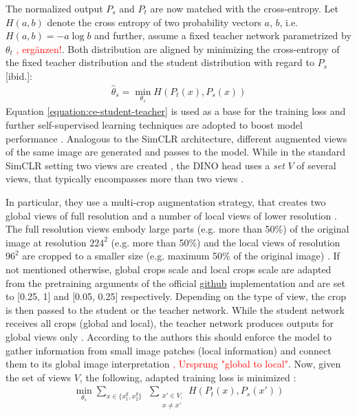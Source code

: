 \par
The normalized output $P_s$ and $P_t$ are now matched with the cross-entropy.
Let $H(a,b)$ denote the cross entropy of two probability vectors $a$, $b$, i.e. $H(a,b)=-a \log b$ and further, assume a fixed teacher network parametrized by $\theta_t$ \textcolor{red}{\citep{Caron2021}, ergänzen!}.
Both distribution are aligned by minimizing the cross-entropy of the fixed teacher distribution and the student distribution with regard to $P_s$ [ibid.]: 
\begin{align}
	\hat{\theta}_s = \min_{\theta_s}H(P_t(x),P_s(x))
	\label{equation:ce-student-teacher}	
\end{align}
Equation \ref{equation:ce-student-teacher} is used as a base for the training loss and further self-supervised learning techniques are adopted to boost model performance \citep{Caron2021}.
Analogous to the SimCLR architecture, different augmented views of the same image are generated and passes to the model.
While in the standard SimCLR setting two views are created \citep{Chen2020}, the DINO head uses a \textit{set} $V$ of several views, that typically encompasses more than two views \citep{Caron2021}.
\par
In particular, they use a multi-crop augmentation strategy, that creates two global views of full resolution and a number of local views of lower resolution \citep{Caron2020, Caron2021}. 
The full resolution views embody large parts (e.g. more than 50\%) of the original image at resolution $224^2$ (e.g. more than 50\%) and the local views of resolution $96^2$ are cropped to a smaller size (e.g. maximum 50\% of the original image) \citep{Caron2021}.
If not mentioned otherwise, global crops scale and local crops scale are adapted from the pretraining arguments of the official \href{https://github.com/facebookresearch/dino#pretrained-models}{github} implementation and are set to [0.25, 1] and [0.05, 0.25] respectively. 
Depending on the type of view, the crop is then passed to the student or the teacher network.
While the student network receives all crops (global and local), the teacher network produces outputs for global views only \citep{Caron2021}.
According to the authors this should enforce the model to gather information from small image patches (local information) and connect them to its global image interpretation \textcolor{red}{\citep{Caron2021}, Ursprung "global to local"}.
Now, given the set of views $V$, the following, adapted training loss is minimized \citep{Caron2021}:
\begin{align}
	\min_{\theta_s}\sum_{x \in \{x_1^g, x_2^g\}} \hspace{5pt} \sum_{\substack{ x\prime \in V, \\ x\neq x\prime}} H(P_t(x),P_s(x\prime))
	\label{equation:dino-training-objective}
\end{align}
